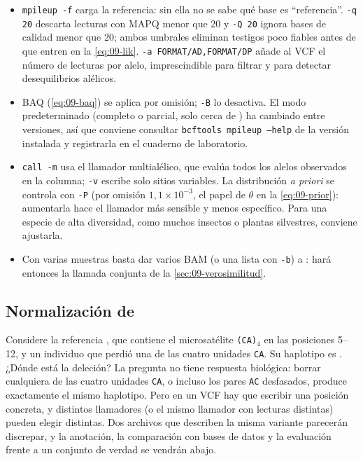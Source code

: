 \begin{itemize}
  \item \texttt{mpileup -f} carga la referencia: sin ella no se sabe qué base es ``referencia''. \texttt{-q 20} descarta lecturas con MAPQ menor que 20 y \texttt{-Q 20} ignora bases de calidad menor que 20; ambos umbrales eliminan testigos poco fiables antes de que entren en la \cref{eq:09-lik}. \texttt{-a FORMAT/AD,FORMAT/DP} añade al VCF el número de lecturas por alelo, imprescindible para filtrar y para detectar desequilibrios alélicos.
  \item BAQ (\cref{eq:09-baq}) se aplica por omisión; \texttt{-B} lo desactiva. El modo predeterminado (completo o parcial, solo cerca de ) ha cambiado entre versiones, así que conviene consultar \texttt{bcftools mpileup --help} de la versión instalada y registrarla en el cuaderno de laboratorio.
  \item \texttt{call -m} usa el llamador multialélico, que evalúa todos los alelos observados en la columna; \texttt{-v} escribe solo sitios variables. La distribución \emph{a priori} se controla con \texttt{-P} (por omisión $1{,}1\times10^{-3}$, el papel de $\theta$ en la \cref{eq:09-prior}): aumentarla hace el llamador más sensible y menos específico. Para una especie de alta diversidad, como muchos insectos o plantas silvestres, conviene ajustarla.
  \item Con varias muestras basta dar varios BAM (o una lista con \texttt{-b}) a :  hará entonces la llamada conjunta de la \cref{sec:09-verosimilitud}.
\end{itemize}

\subsection{Normalización de }

Considere la referencia , que contiene el microsatélite \texttt{(CA)}$_4$ en las posiciones 5--12, y un individuo que perdió una de las cuatro unidades \texttt{CA}. Su haplotipo es . ¿Dónde está la deleción? La pregunta no tiene respuesta biológica: borrar cualquiera de las cuatro unidades \texttt{CA}, o incluso los pares \texttt{AC} desfasados, produce exactamente el mismo haplotipo. Pero en un VCF hay que escribir una posición concreta, y distintos llamadores (o el mismo llamador con lecturas distintas) pueden elegir distintas. Dos archivos que describen la misma variante parecerán discrepar, y la anotación, la comparación con bases de datos y la evaluación frente a un conjunto de verdad se vendrán abajo.

